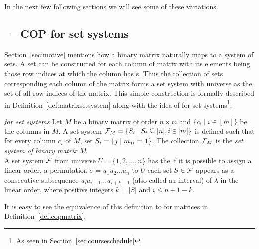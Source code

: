 In the next few following sections we will see some of these
variations.




\subsection{\PQRtree\ --  COP for set systems}
\label{sec:surveycertalgo}

Section~\ref{sec:motive} mentions how a binary matrix naturally maps
to a system of sets.  A set can be constructed for each column of
matrix with its elements being those row indices at which the column
has \un s. Thus the collection of sets corresponding each column of
the matrix forms a set system with universe as the set of all row
indices of the matrix.  This simple construction is formally described
in Definition~\ref{def:matrixsetsystem} along with the idea of \cop
for set systems\footnote{As seen in Section~\ref{sec:courseschedule}}.

\begin{definition}%
  \label{def:matrixsetsystem}{\emph{\Cop for set systems}}%
   Let $M$ be a binary matrix of order
  $n \times m$ %
  and $\{c_i \mid i \in [m]\}$ be the columns in $M$. A set system
  ${\cal F}_{M} = \{S_i \mid S_i \subseteq [n], i \in [m]\}$ is defined
  such that for every column $c_i$ of $M$, set $S_i = \{j \mid m_{ji}
  = \textbf{1} \}$. The collection ${\cal F}_M$ is the {\em set system of binary
    matrix} $M$.\\
  A set system ${\cal F}$ from universe $U = \{1, 2, \ldots, n\}$ has the
  {\em \cop} if it is possible to assign a linear order, \ie a
  permutation $\sigma = u_1u_2\ldots u_n$ to $U$ \stt each set $S \in
  {\cal F}$ appears as a consecutive subsequence $u_{i}u_{i+1}\ldots
  u_{i+k-1}$ (also called an interval) of $\lambda$ in the linear order, where
  positive integers $k = |S|$ and $i \le n+1-k$.
\end{definition}

It is easy to see the equivalence of this definition to \COP for
matrices in Definition~\ref{def:copmatrix}.

